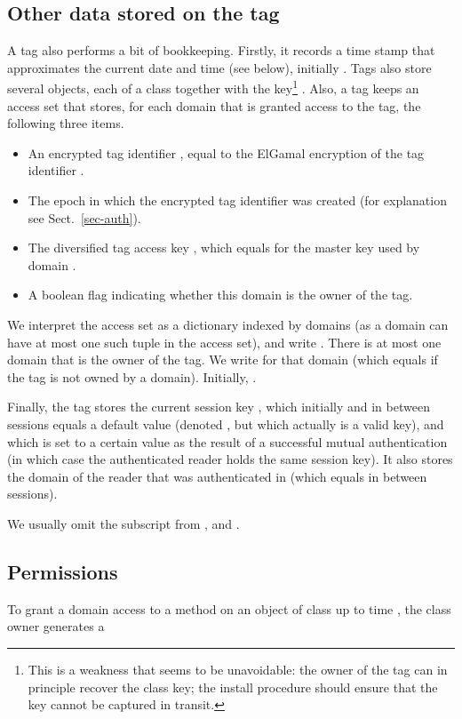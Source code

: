 \subsection{Other data stored on the tag}

A tag  also performs a bit of bookkeeping. Firstly, it records
a time stamp  that approximates the current date and time (see
below), initially .  
Tags also store several objects, each of a class  together
with the key\footnote{This is a weakness that seems to be unavoidable: the owner of
	the tag can in principle recover the class key; the install
	procedure should ensure that the key cannot be captured in transit.
}
. 
Also, a tag  keeps an access set  that
stores, for each domain  that is granted access to the tag, the
following three items.
\begin{itemize}
\fixlistspacing
\item An encrypted tag identifier , equal to the ElGamal encryption
 of the tag identifier .
\item The epoch  in which the encrypted tag identifier was created
  (for explanation see Sect.~\ref{sec-auth}).
\item The diversified tag access key , which equals  
for the master key  used by domain . 
\item A boolean flag indicating whether this domain is the owner of the tag.
\end{itemize}
We interpret the access set as a dictionary indexed by domains
(as a domain can have at most one such tuple in the access set), and
write .
There is at most one domain that is the owner of the tag. We write
 for that domain (which equals  if the tag is not owned
by a domain). 
Initially, .

Finally, the tag stores the current session key , which initially and
in between sessions equals a default value (denoted , but which actually
is a valid key), and which is set to a
certain value as the result of a successful mutual authentication (in which case
the authenticated reader holds the same session key). It also stores the
domain of the reader that was authenticated in  (which equals
 in between sessions).

We usually omit the subscript from ,  and
. 


\subsection{Permissions}
\label{ssec-permissions}

To grant a domain  access to a method  on an object of
class  up to time , the class owner  
generates a 
 
